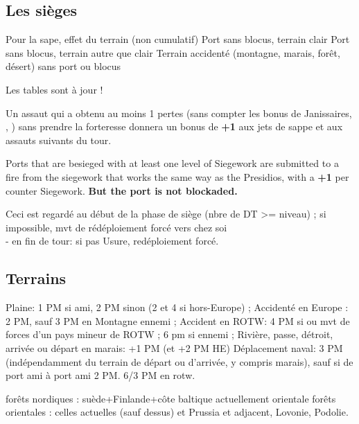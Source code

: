 \subsection{Les sièges}
\aparag Pour la sape, effet du terrain (non cumulatif)
      Port sans blocus, terrain clair
      Port sans blocus, terrain autre que clair
 Terrain accidenté (montagne, marais, forêt, désert) sans port
ou blocus


\aparag Les tables sont à jour !

\aparag[Expérimental]
Un assaut qui a obtenu au moins 1 pertes (sans compter les bonus
de Janissaires, \RUS, \POL) sans prendre la forteresse donnera un
bonus de {\bf +1} aux jets de sappe et aux assauts suivants du tour.

Ports that are besieged with at least one level of Siegework are
submitted to a fire from the siegework that works the same way as the
Presidios, with a {\bf +1} per counter Siegework\faceplus.  {\bf But the
 port is not blockaded.}

Ceci est regardé au début de la phase de siège (nbre de DT >= niveau) ;
si impossible, mvt de rédéploiement forcé vers chez soi \\
- en fin de tour: si pas Usure\faceplus, redéploiement forcé.


\subsection{Terrains}

\bparag Plaine: 1 PM si ami, 2 PM sinon (2 et 4 si hors-Europe) ;
\bparag Accidenté en Europe : 2 PM, sauf 3 PM en Montagne ennemi ;
\bparag Accident en ROTW: 4 PM si ou mvt de forces d'un pays mineur de
ROTW ; 6 pm si ennemi ;
\bparag Rivière, passe, détroit, arrivée ou départ en marais: +1 PM (et
+2 PM HE)
\bparag Déplacement naval: 3 PM (indépendamment du terrain de départ ou
d'arrivée, y compris marais), sauf si de port ami à port ami 2 PM. 6/3
PM en rotw.

\bparag  forêts nordiques : suède+Finlande+côte baltique actuellement orientale
\bparag forêts orientales : celles actuelles (sauf dessus) et Prussia et
adjacent, Lovonie, Podolie.



